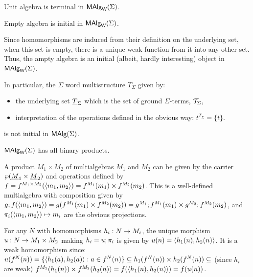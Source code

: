 \documentclass[10pt]{article}
\begin{document}
\begin{Fact}\label{le:init}
Unit algebra is terminal in $\mbox{\rm\sf MAlg}_{\sf W}(\Sigma)$.
\end{Fact}

\begin{Fact}
Empty algebra is initial in $\mbox{\rm\sf MAlg}_{\sf W}(\Sigma)$.
\end{Fact}

\begin{Proof}
Since homomorphisms are induced from their definition on the
underlying set, when this set is empty, there is a unique weak
function from it into any other set. Thus, the ampty algebra is an
initial (albeit, hardly interesting) object in $\mbox{\rm\sf MAlg}_{\sf W}(\Sigma)$.
\end{Proof}

\noindent
In particular, the $\Sigma$ word multistructure $T_\Sigma$ given by:
%
\begin{itemize}\MyLPar
\item 
the underlying set $\underline {T}_\Sigma$ which is the set of ground
$\Sigma$-terms, ${\cal T}_{\Sigma}$,

\item 
interpretation of the operations defined in the obvious way:
$t^{T_{\Sigma}}=\{t\}$.
\end{itemize}
%
is not initial in $\mbox{\rm\sf MAlg}(\Sigma)$.

\begin{Lemma}
$\mbox{\rm\sf MAlg}_{\sf W}(\Sigma)$ has all binary products.
\end{Lemma}

\begin{Proof}
A product $M_1\times M_2$ of multialgebras $M_1$ and $M_2$ can be
given by the carrier $\wp{(\underline {M}_1\times \underline {M}_2)}$ and
operations defined by $f=f^{M_1\times M_2}(\langle m_1,m_2\rangle) =
f^{M_1}(m_1)\times f^{M_2}(m_2)$.  This is a well-defined multialgebra
with composition given by $g;f(\langle m_1,m_2\rangle) =
g(f^{M_1}(m_1)\times f^{M_2}(m_2)) =
g^{M_1};f^{M_1}(m_1)\times g^{M_2};f^{M_2}(m_2)$, and
$\pi_i(\langle m_1,m_2\rangle)\mapsto m_i$ are the obvious projections.

For any $N$ with homomorphisms $h_i:N\rightarrow M_i$, the unique morphism
$u:N\rightarrow M_1\times M_2$ making $h_i=u;\pi_i$ is given by
$u(n)=\langle h_1(n),h_2(n)\rangle$. It is a weak homomorphism since:
$u(f^N(n)) = \{\langle h_1(a),h_2(a)\rangle:a\in f^N(n)\} \subseteq
h_1(f^N(n))\times h_2(f^N(n)) \subseteq$ (since $h_i$ are weak)
$f^{M_1}(h_1(n))\times f^{M_2}(h_2(n)) = f(\langle h_1(n),h_2(n)\rangle) =
f(u(n))$.
\end{Proof}
\end{document}
